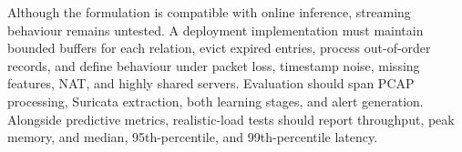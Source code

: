 \documentclass[11pt,fleqn]{report}
\begin{document}
Although the formulation is compatible with online inference, streaming behaviour remains untested. A deployment implementation must maintain bounded buffers for each relation, evict expired entries, process out-of-order records, and define behaviour under packet loss, timestamp noise, missing features, NAT, and highly shared servers. Evaluation should span PCAP processing, Suricata extraction, both learning stages, and alert generation. Alongside predictive metrics, realistic-load tests should report throughput, peak memory, and median, 95th-percentile, and 99th-percentile latency.

\appendix




\end{document}

